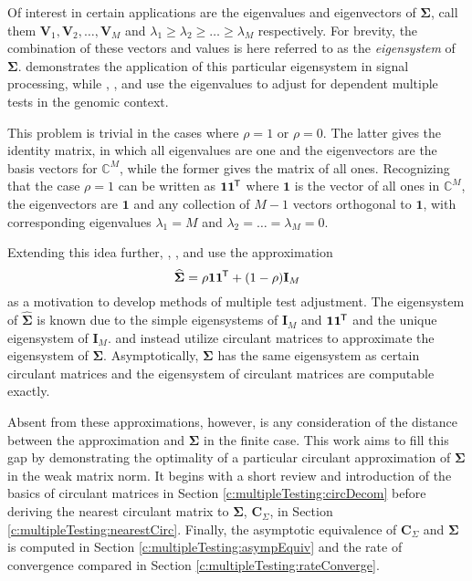 \documentclass[letterpaper,12pt,oneside,final]{article}
\newcommand{\ve}[1]{\mathbf{#1}}           %
\newcommand{\m}[1]{\mathbf{#1}}               %
\newcommand{\sm}[1]{\boldsymbol{#1}}   %
\newcommand{\tr}[1]{{#1}^{\mkern-1.5mu\mathsf{T}}}              %
\newcommand{\field}[1]{\mathbb{#1}}
\newcommand{\Complex}{\field{C}}
\begin{document}
Of interest in certain applications are the eigenvalues and eigenvectors of $\sm{\Sigma}$, call them $\ve{V}_1, \ve{V}_2, \dots, \ve{V}_M$ and $\lambda_1 \geq \lambda_2 \geq \dots \geq \lambda_M$ respectively. For brevity, the combination of these vectors and values is here referred to as the \emph{eigensystem} of $\sm{\Sigma}$. \cite{gray2006toeplitz} demonstrates the application of this particular eigensystem in signal processing, while \cite{cheverud2001}, \cite{LiJi2005}, and \cite{Galwey2009} use the eigenvalues to adjust for dependent multiple tests in the genomic context.

This problem is trivial in the cases where $\rho = 1$ or $\rho = 0$. The latter gives the identity matrix, in which all eigenvalues are one and the eigenvectors are the basis vectors for $\Complex^M$, while the former gives the matrix of all ones. Recognizing that the case $\rho = 1$ can be written as $\ve{1} \tr{\ve{1}}$ where $\ve{1}$ is the vector of all ones in $\Complex^M$, the eigenvectors are $\ve{1}$ and any collection of $M-1$ vectors orthogonal to $\ve{1}$, with corresponding eigenvalues $\lambda_1 = M$ and $\lambda_2 = \dots = \lambda_M = 0$.

Extending this idea further, \cite{cheverud2001}, \cite{LiJi2005}, and \cite{Galwey2009} use the approximation
\begin{equation} \label{eq:multipleTesting:commonCor}
 \widehat{\sm{\Sigma}} = \rho \ve{1} \tr{\ve{1}} + (1 - \rho) \m{I}_M
\end{equation}
as a motivation to develop methods of multiple test adjustment. The eigensystem of $\widehat{\sm{\Sigma}}$ is known due to the simple eigensystems of $\m{I}_M$ and $\ve{1} \tr{\ve{1}}$ and the unique eigensystem of  $\m{I}_M$. \cite{gray2006toeplitz} and \cite{grenanderszego1958} instead utilize circulant matrices to approximate the eigensystem of $\sm{\Sigma}$. Asymptotically, $\sm{\Sigma}$ has the same eigensystem as certain circulant matrices and the eigensystem of circulant matrices are computable exactly.

Absent from these approximations, however, is any consideration of the distance between the approximation and $\sm{\Sigma}$ in the finite case. This work aims to fill this gap by demonstrating the optimality of a particular circulant approximation of $\sm{\Sigma}$ in the weak matrix norm. It begins with a short review and introduction of the basics of circulant matrices in Section \ref{c:multipleTesting:circDecom} before deriving the nearest circulant matrix to $\sm{\Sigma}$, $\m{C}_{\Sigma}$, in Section \ref{c:multipleTesting:nearestCirc}. Finally, the asymptotic equivalence of $\m{C}_{\Sigma}$ and $\sm{\Sigma}$ is computed in Section \ref{c:multipleTesting:asympEquiv} and the rate of convergence compared in Section \ref{c:multipleTesting:rateConverge}.
\end{document}
